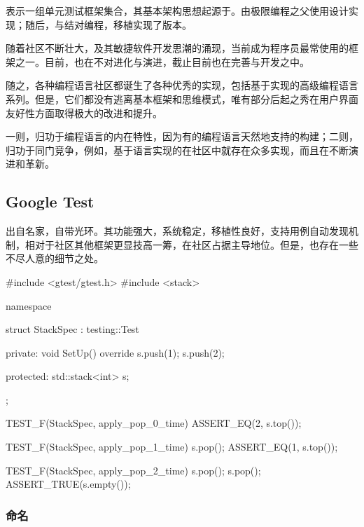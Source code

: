 \begin{content}

表示一组单元测试框架集合，其基本架构思想起源于。由极限编程之父使用设计实现；随后，与结对编程，移植实现了版本。

随着社区不断壮大，及其敏捷软件开发思潮的涌现，当前成为程序员最常使用的框架之一。目前，也在不对进化与演进，截止目前也在完善与开发之中。

随之，各种编程语言社区都诞生了各种优秀的实现，包括基于实现的高级编程语言系列。但是，它们都没有逃离基本框架和思维模式，唯有部分后起之秀在用户界面友好性方面取得极大的改进和提升。

一则，归功于编程语言的内在特性，因为有的编程语言天然地支持的构建；二则，归功于同门竞争，例如，基于\cpp{}语言实现的在社区中就存在众多实现，而且在不断演进和革新。

\subsection{Google Test}

出自名家，自带光环。其功能强大，系统稳定，移植性良好，支持用例自动发现机制，相对于社区其他框架更显技高一筹，在社区占据主导地位。但是，也存在一些不尽人意的细节之处。

\begin{leftbar}
 \begin{c++}
#include <gtest/gtest.h>
#include <stack>

namespace {
  struct StackSpec : testing::Test {
  private:
    void SetUp() override {
      s.push(1);
      s.push(2);
    }

  protected:
    std::stack<int> s;
  };
}

TEST_F(StackSpec, apply_pop_0_time) {
  ASSERT_EQ(2, s.top());
}

TEST_F(StackSpec, apply_pop_1_time) {
  s.pop();
  ASSERT_EQ(1, s.top());
}

TEST_F(StackSpec, apply_pop_2_time) {
  s.pop();
  s.pop();
  ASSERT_TRUE(s.empty());
}
 \end{c++}
\end{leftbar}

\subsubsection{命名}


\end{content}
